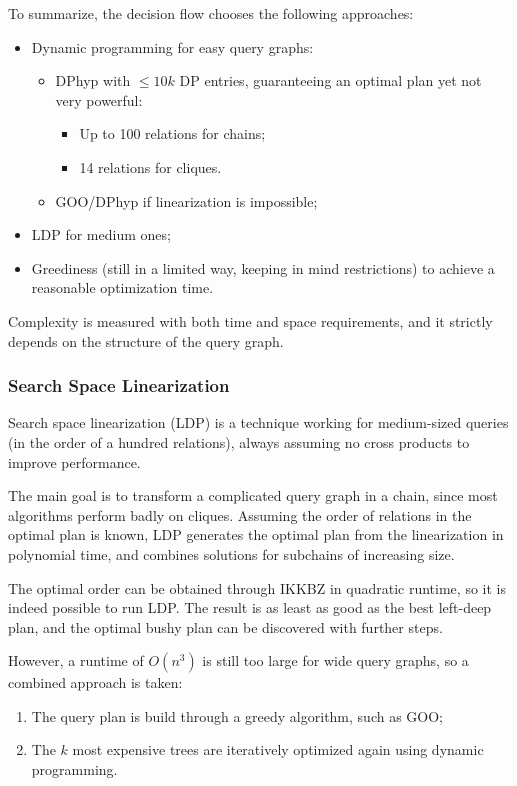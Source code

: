 To summarize, the decision flow chooses the following approaches:
\begin{itemize}
	\item Dynamic programming for easy query graphs:
	\begin{itemize}
		\item DPhyp with $\leq 10k$ DP entries, guaranteeing an optimal plan yet not very powerful:
		\begin{itemize}
			\item Up to 100 relations for chains;
			\item 14 relations for cliques.
		\end{itemize}
		\item GOO/DPhyp if linearization is impossible;
	\end{itemize}
	\item LDP for medium ones;
	\item Greediness (still in a limited way, keeping in mind restrictions) to achieve a reasonable optimization time.
\end{itemize}

Complexity is measured with both time and space requirements, and it strictly depends on the structure of the query graph.

\subsubsection{Search Space Linearization}
Search space linearization (LDP) is a technique working for medium-sized queries (in the order of a hundred relations), always assuming no cross products to improve performance. 

The main goal is to transform a complicated query graph in a chain, since most algorithms perform badly on cliques. Assuming the order of relations in the optimal plan is known, LDP generates the optimal plan from the linearization in polynomial time, and combines solutions for subchains of increasing size.

The optimal order can be obtained through IKKBZ in quadratic runtime, so it is indeed possible to run LDP. The result is as least as good as the best left-deep plan, and the optimal bushy plan can be discovered with further steps.

However, a runtime of $O(n^3)$ is still too large for wide query graphs, so a combined approach is taken:
\begin{enumerate}
	\item The query plan is build through a greedy algorithm, such as GOO;
	\item The $k$ most expensive trees are iteratively optimized again using dynamic programming.
\end{enumerate}

